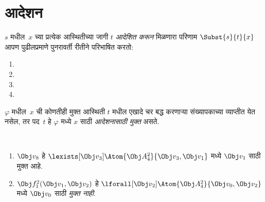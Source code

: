 \section{आदेशन}\label{fol:syn:sub:sec}

\begin{defn}[पदातील आदेशन]
$s$ मधील~$x$ च्या प्रत्येक आस्थितीच्या जागी $t$ \emph{आदेशित करून}
मिळणारा परिणाम $\Subst{s}{t}{x}$ आपण पुढीलप्रमाणे पुनरावर्ती रीतीने
परिभाषित करतो:
\begin{enumerate}
\item {}

\item {}

\item {}

\item{}
\end{enumerate}
\end{defn}

\begin{defn}
$\varphi$ मधील~$x$ ची कोणतीही मुक्त आस्थिती $t$ मधील एखादे चर बद्ध करणाऱ्या
संख्यापकाच्या व्याप्तीत येत नसेल, तर पद~$t$ हे $\varphi$ मध्ये $x$ साठी
\emph{आदेशनासाठी मुक्त} असते.
\end{defn}

\begin{ex} ~
\begin{enumerate}
\item $\Obj v_8$ हे $\lexists[\Obj
  v_3]\Atom{\Obj A^2_4}{\Obj v_3,\Obj v_1}$ मध्ये $\Obj v_1$ साठी
  मुक्त आहे.

\item $\Obj f^2_1(\Obj v_1, \Obj v_2)$ हे
  $\lforall[\Obj v_2]\Atom{\Obj A^2_4}{\Obj v_0,\Obj v_2}$ मध्ये
  $\Obj v_0$ साठी \emph{मुक्त नाही}.
\end{enumerate}
\end{ex}

